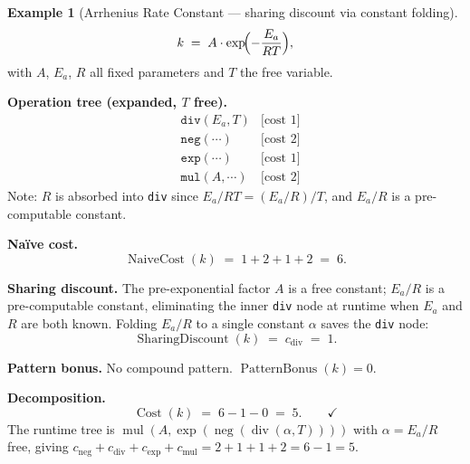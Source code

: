 \documentclass[12pt,a4paper]{article}
\theoremstyle{definition}
\newtheorem{example}[theorem]{Example}
\newcommand{\Cost}{\operatorname{Cost}}
\newcommand{\NC}{\operatorname{NaiveCost}}
\newcommand{\SD}{\operatorname{SharingDiscount}}
\newcommand{\PB}{\operatorname{PatternBonus}}
\begin{document}
\begin{example}[Arrhenius Rate Constant --- sharing discount via constant folding]
\label{ex:arrhenius}
\[
  k \;=\; A \cdot \exp\!\Bigl(-\frac{E_a}{RT}\Bigr),
\]
with $A$, $E_a$, $R$ all fixed parameters and $T$ the free variable.

\textbf{Operation tree (expanded, $T$ free).}
\begin{align*}
  & \texttt{div}(E_a, T)             &\text{[cost 1]} \\
  & \texttt{neg}(\cdots)             &\text{[cost 2]} \\
  & \texttt{exp}(\cdots)             &\text{[cost 1]} \\
  & \texttt{mul}(A, \cdots)          &\text{[cost 2]}
\end{align*}
Note: $R$ is absorbed into \texttt{div} since $E_a/RT = (E_a/R)/T$, and
$E_a/R$ is a pre-computable constant.

\textbf{Na\"{i}ve cost.}
\[
  \NC(k) \;=\; 1 + 2 + 1 + 2 \;=\; 6.
\]

\textbf{Sharing discount.}
The pre-exponential factor $A$ is a free constant;
$E_a/R$ is a pre-computable constant, eliminating the inner \texttt{div}
node at runtime when $E_a$ and $R$ are both known.
Folding $E_a/R$ to a single constant $\alpha$ saves the \texttt{div} node:
\[
  \SD(k) \;=\; c_{\mathrm{div}} \;=\; 1.
\]

\textbf{Pattern bonus.}
No compound pattern.  $\PB(k) = 0$.

\textbf{Decomposition.}
\[
  \Cost(k) \;=\; 6 - 1 - 0 \;=\; 5. \qquad \checkmark
\]
The runtime tree is
$\operatorname{mul}(A, \operatorname{exp}(\operatorname{neg}(\operatorname{div}(\alpha, T))))$
with $\alpha = E_a/R$ free, giving $c_{\mathrm{neg}} + c_{\mathrm{div}} + c_{\exp} + c_{\mathrm{mul}}
= 2 + 1 + 1 + 2 = 6 - 1 = 5$.
\end{example}
\end{document}
